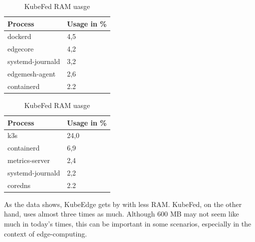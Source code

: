 \documentclass[MSC,Master,english]{twbook}%
\begin{document}
\begin{table}[ht]
    \begin{center}
        \begin{minipage}{.49\linewidth}
            \begin{center}
                \begin{tabular}{|l|l|}
                    \hline
                    Process & Usage in \%  \\
                    \hline
                    dockerd & 4,5 \\
                    edgecore & 4,2 \\
                    systemd-journald & 3,2 \\
                    edgemesh-agent & 2,6 \\
                    containerd & 2.2 \\
                    \hline
                \end{tabular}
                \caption{KubeEdge RAM uasge}
                \label{tab:ke-ram-noload}
            \end{center}
        \end{minipage}
        \begin{minipage}{.49\linewidth}
            \begin{center}
                \begin{tabular}{|l|l|}
                    \hline
                    Process & Usage in \%  \\
                    \hline
                    k3s & 24,0 \\
                    containerd & 6,9 \\
                    metrics-server & 2,4 \\
                    systemd-journald & 2,2 \\
                    coredns & 2.2 \\
                    \hline
                \end{tabular}
                \caption{KubeFed RAM uasge}
                \label{tab:kf-ram-noload}
            \end{center}
        \end{minipage}
    \end{center}
\end{table}
As the data shows, KubeEdge gets by with less RAM. KubeFed, on the other hand, uses almost three times as much. Although 600 MB may not seem like much in today's times, this can be important in some scenarios, especially in the context of edge-computing.
\end{document}
